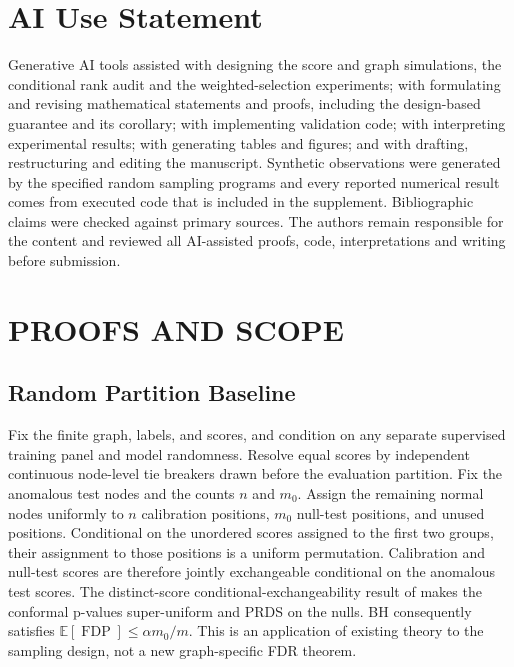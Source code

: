 \documentclass[twoside]{article}
\newcommand{\FDP}{\operatorname{FDP}}
\newcommand{\E}{\mathbb{E}}
\begin{document}
\clearpage
\section*{AI Use Statement}
Generative AI tools assisted with designing the score and graph simulations, the conditional rank audit and the weighted-selection experiments; with formulating and revising mathematical statements and proofs, including the design-based guarantee and its corollary; with implementing validation code; with interpreting experimental results; with generating tables and figures; and with drafting, restructuring and editing the manuscript. Synthetic observations were generated by the specified random sampling programs and every reported numerical result comes from executed code that is included in the supplement. Bibliographic claims were checked against primary sources. The authors remain responsible for the content and reviewed all AI-assisted proofs, code, interpretations and writing before submission.



\clearpage
\clearpage\appendix\onecolumn
\section{PROOFS AND SCOPE}
\label{app:proofs}
\subsection{Random Partition Baseline}
\label{app:randomdesign}
Fix the finite graph, labels, and scores, and condition on any separate supervised training panel and model randomness. Resolve equal scores by independent continuous node-level tie breakers drawn before the evaluation partition. Fix the anomalous test nodes and the counts $n$ and $m_0$. Assign the remaining normal nodes uniformly to $n$ calibration positions, $m_0$ null-test positions, and unused positions. Conditional on the unordered scores assigned to the first two groups, their assignment to those positions is a uniform permutation. Calibration and null-test scores are therefore jointly exchangeable conditional on the anomalous test scores. The distinct-score conditional-exchangeability result of \citet[Theorem 3.3]{marandon2024adaptive} makes the conformal p-values super-uniform and PRDS on the nulls. BH consequently satisfies $\E[\FDP]\le\alpha m_0/m$. This is an application of existing theory to the sampling design, not a new graph-specific FDR theorem.
\end{document}

